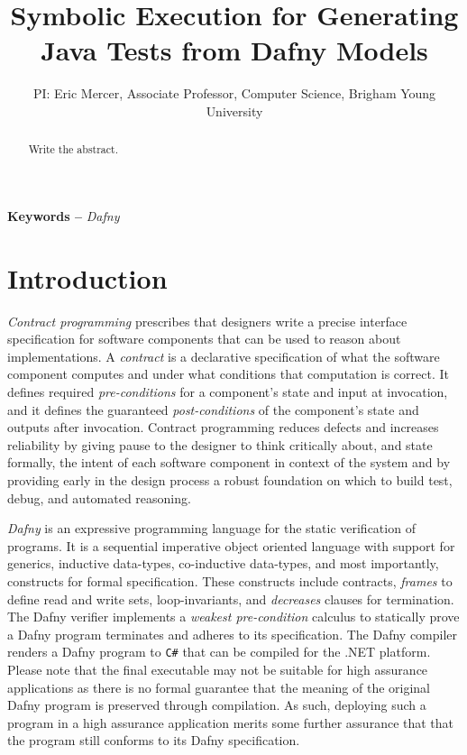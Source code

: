 \documentclass[11pt,onecolumn,notitlepage]{article}
\begin{document}
\title{Symbolic Execution for Generating Java Tests from Dafny Models}
\author{PI: Eric Mercer, Associate Professor, Computer Science, Brigham Young University}
\maketitle

\begin{abstract}
  Write the abstract.
\end{abstract}

\providecommand{\keywords}[1]{\noindent\textbf{Keywords -- } \textit{#1}}
\keywords{Dafny}

\section*{Introduction}
\emph{Contract programming} prescribes that designers write a precise interface specification for software components that can be used to reason about implementations. A \emph{contract} is a declarative specification of what the software component computes and under what conditions that computation is correct. It defines required \emph{pre-conditions} for a component's state and input at invocation, and it defines the guaranteed \emph{post-conditions} of the component's state and outputs after invocation. Contract programming reduces defects and increases reliability by giving pause to the designer to think critically about, and state formally, the intent of each software component in context of the system and by providing early in the design process a robust foundation on which to build test, debug, and automated reasoning. 

\emph{Dafny} is an expressive programming language for the static verification of programs. It is a sequential imperative object oriented language with support for generics, inductive data-types, co-inductive data-types, and most importantly, constructs for formal specification. These constructs include contracts, \emph{frames} to define read and write sets, loop-invariants, and \emph{decreases} clauses for termination. The Dafny verifier implements a \emph{weakest pre-condition} calculus to statically prove a Dafny program terminates and adheres to its specification. The Dafny compiler renders a Dafny program to \texttt{C\#} that can be compiled for the .NET platform. Please note that the final executable may not be suitable for high assurance applications as there is no formal guarantee that the meaning of the original Dafny program is preserved through compilation. As such, deploying such a program in a high assurance application merits some further assurance that that the program still conforms to its Dafny specification.  
\end{document}
